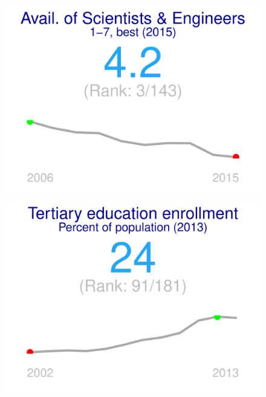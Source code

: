 \documentclass{article}\usepackage[]{graphicx}\usepackage[]{color}
\makeatletter
\def\maxwidth{ %
  \ifdim\Gin@nat@width>\linewidth
    \linewidth
  \else
    \Gin@nat@width
  \fi
}
\makeatother
\begin{document}
\begin{figure}
\begin{minipage}[t]{0.99\textwidth}
\begin{minipage}[t]{0.55\textwidth}
\begin{minipage}[c]{0.30\textwidth}
    \end{minipage}
    
    \begin{minipage}[c]{0.30\textwidth}


{\centering \includegraphics[width=\maxwidth]{figure/figure_sparkline4-1} 

}



    \end{minipage}
    \begin{minipage}[c]{0.30\textwidth}


{\centering \includegraphics[width=\maxwidth]{figure/figure_sparkline5-1} 

}




\end{minipage}
\end{minipage}
\end{minipage}
\end{figure}
\end{document}

